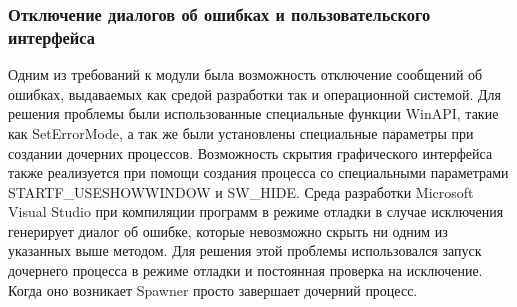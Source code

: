 \documentclass{imcs}
\begin{document}
\subsubsection{Отключение диалогов об ошибках и пользовательского интерфейса}
Одним из требований к модули была возможность отключение сообщений об ошибках, выдаваемых как средой разработки так и операционной системой. Для решения проблемы были использованные специальные функции WinAPI, такие как SetErrorMode, а так же были установлены специальные параметры при создании дочерних процессов.
Возможность скрытия графического интерфейса также реализуется при помощи создания процесса со специальными параметрами STARTF\_USESHOWWINDOW и SW\_HIDE.
Среда разработки Microsoft Visual Studio при компиляции программ в режиме отладки в случае исключения генерирует диалог об ошибке, которые невозможно скрыть ни одним из указанных выше методом. Для решения этой проблемы использовался запуск дочернего процесса в режиме отладки и постоянная проверка на исключение. Когда оно возникает Spawner просто завершает дочерний процесс.
\end{document}
